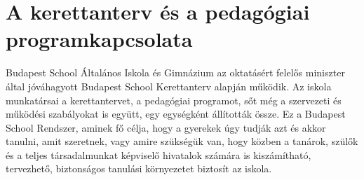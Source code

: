 \section{A kerettanterv és a pedagógiai program\hfill\break  kapcsolata}
\label{sec:tanterv-program}
Budapest School Általános Iskola és Gimnázium az oktatásért felelős miniszter által jóváhagyott Budapest School Kerettanterv alapján működik. Az iskola munkatársai a kerettantervet, a pedagógiai programot, sőt még a szervezeti és működési szabályokat is együtt, egy egységként állították össze. Ez a Budapest School Rendszer, aminek fő célja, hogy a gyerekek úgy tudják azt és akkor tanulni, amit szeretnek, vagy amire szükségük van, hogy közben a tanárok, szülők és a teljes társadalmunkat képviselő hivatalok számára is kiszámítható, tervezhető, biztonságos tanulási környezetet biztosít az iskola.